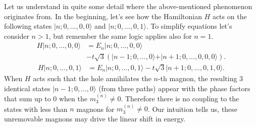 \documentclass[11pt, a4paper, onecolumn]{article}
\newcommand{\ket}[1]{\vert #1 \rangle}
\begin{document}
Let us understand in quite some detail where the above-mentioned phenomenon originates from. In the beginning, let's see how the Hamiltonian $H$ acts on the following states $\ket{n;0,...,0,0}$ and $\ket{n;0,...,0,1}$. To simplify equations let's consider $n>1$, but remember the same logic applies also for $n = 1$.
\begin{equation}
\begin{aligned}
	H\ket{n;0,...,0,0} &= E_n \ket{n;0,...,0,0} \\
	&-t\sqrt{3}\left(\ket{n-1;0,...,0} + \ket{n+1;0,...,0,0,0}\right).
\end{aligned}
\end{equation}
\begin{equation}
\begin{aligned}
	H\ket{n;0,...,0,1} &= E_n \ket{n;0,...,0,1} -t\sqrt{3}\ket{n+1;0,...,0,1,0}.
\end{aligned}
\end{equation}
When $H$ acts such that the hole annihilates the $n$-th magnon, the resulting 3 identical states $\ket{n-1;0,...,0}$ (from three paths) appear with the phase factors that sum up to 0 when the $m^{(n)}_3 \neq 0$. Therefore there is no coupling to the states with less than $n$ magnons for $m^{(n)}_3 \neq 0$. Our intuition tells us, these unremovable magnons may drive the linear shift in energy.
\end{document}
